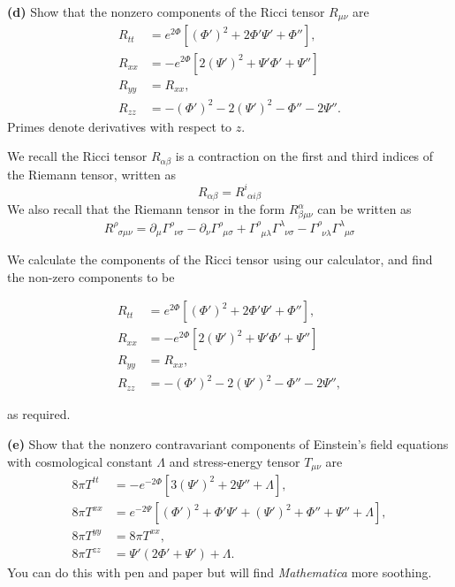 \documentclass[a4paper]{article} %
\newcommand{\ph}[1]{\phantom{#1}}
\begin{document}
\begin{framed}
\textbf{(d)} Show that the nonzero components of the Ricci tensor $R_{\mu\nu}$ are
\begin{align}
R_{tt}&=e^{2\Phi}[(\Phi')^2+2\Phi' \Psi' +\Phi''],\\
R_{xx}&=-e^{2\Phi}[2(\Psi')^2+\Psi' \Phi' + \Psi'']\\
R_{yy}&=R_{xx},\\
R_{zz}&=-(\Phi')^2-2(\Psi')^2-\Phi''-2\Psi''.
\end{align}
Primes denote derivatives with respect to $z$.
\end{framed}

We recall the Ricci tensor $R_{\alpha\beta}$ is a contraction on the first and third indices of the Riemann tensor, written as
\begin{equation}
R_{\alpha\beta}=R^{i}_{\ph{i}\alpha i \beta}
\end{equation}
We also recall that the Riemann tensor in the form $R^{\alpha}_{\beta\mu\nu}$ can be written as
\begin{equation}
R^{\rho}_{\ph{\rho}\sigma \mu\nu}=\partial_{\mu}\Gamma^{\rho}_{\ph{\rho}\nu\sigma}
-\partial_{\nu}\Gamma^{\rho}_{\ph{\rho}\mu\sigma}
+\Gamma^{\rho}_{\ph{\rho}\mu\lambda}\Gamma^{\lambda}_{\ph{\lambda}\nu \sigma}
-\Gamma^{\rho}_{\ph{\rho}\nu\lambda}\Gamma^{\lambda}_{\ph{\lambda}\mu\sigma}
\end{equation}

We calculate the components of the Ricci tensor using our calculator, and find the non-zero components to be

\begin{align}
R_{tt}&=e^{2\Phi}[(\Phi')^2+2\Phi' \Psi' +\Phi''],\\
R_{xx}&=-e^{2\Phi}[2(\Psi')^2+\Psi' \Phi' + \Psi'']\\
R_{yy}&=R_{xx},\\
R_{zz}&=-(\Phi')^2-2(\Psi')^2-\Phi''-2\Psi'',
\end{align}

as required.


\begin{framed}
\textbf{(e)} Show that the nonzero contravariant components of Einstein’s field equations with
cosmological constant $\Lambda$ and stress-energy tensor $T_{\mu\nu}$ are
\begin{align}
8\pi T^{tt}&=-e^{-2\Phi}[3(\Psi')^2+2\Psi''+\Lambda],\\
8\pi T^{xx}&=e^{-2\Psi}[(\Phi')^2+\Phi' \Psi' + (\Psi')^2+\Phi'' + \Psi'' + \Lambda],\\
8\pi T^{yy}&=8\pi T^{xx},\\
8\pi T^{zz}&=\Psi'(2\Phi' + \Psi')+\Lambda.
\end{align}
You can do this with pen and paper but will find \emph{Mathematica} more soothing.
\end{framed}
\end{document}
